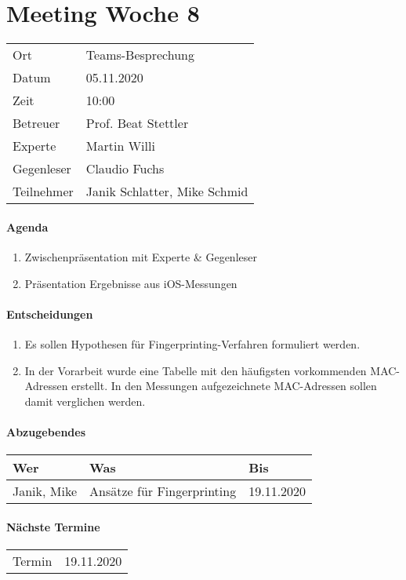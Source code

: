 \section*{Meeting Woche 8}

\begin{table}[h!]
	\begin{tabularx}{\textwidth}{l X }
		Ort & Teams-Besprechung \\
		Datum & 05.11.2020 \\
		Zeit & 10:00 \\
        Betreuer & Prof. Beat Stettler\\
        Experte & Martin Willi \\
        Gegenleser & Claudio Fuchs \\
		Teilnehmer & Janik Schlatter, Mike Schmid \\
	\end{tabularx}
\end{table}

\paragraph{Agenda}
\begin{enumerate}
	\item Zwischenpräsentation mit Experte \& Gegenleser
	\item Präsentation Ergebnisse aus iOS-Messungen 
\end{enumerate}

\paragraph{Entscheidungen}
\begin{enumerate}
	\item Es sollen Hypothesen für Fingerprinting-Verfahren formuliert werden.
	\item In der Vorarbeit wurde eine Tabelle mit den häufigsten vorkommenden 
    MAC-Adressen erstellt. In den Messungen aufgezeichnete MAC-Adressen sollen 
    damit verglichen werden.
\end{enumerate}

\paragraph{Abzugebendes}
\begin{tabbing}
	\begin{tabu} to \linewidth {l X l }
        \toprule
        \textbf{Wer} & \textbf{Was} & \textbf{Bis} \\
		\midrule
		Janik, Mike & Ansätze für Fingerprinting & 19.11.2020 \\
		\bottomrule
    \end{tabu}
\end{tabbing}

\paragraph{Nächste Termine} \hfill
\begin{table}[h!]
	\begin{tabularx}{\textwidth}{l X }
		Termin & 19.11.2020 \\
	\end{tabularx}
\end{table}

\clearpage